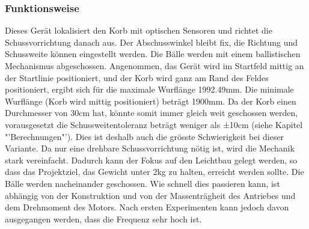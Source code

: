 \subsubsection{Funktionsweise}
Dieses Gerät lokalisiert den Korb mit optischen Sensoren und richtet die 
Schussvorrichtung danach aus. Der Abschusswinkel bleibt fix, die Richtung und 
Schussweite können eingestellt werden. Die Bälle werden mit einem 
ballistischen Mechanismus abgeschossen. Angenommen, das Gerät wird im Startfeld 
mittig an der Startlinie positioniert, und der Korb wird ganz am Rand des 
Feldes positioniert, ergibt sich für die maximale Wurflänge 1992.49mm. Die 
minimale Wurflänge (Korb wird mittig positioniert) beträgt 1900mm. Da der Korb 
einen Durchmesser von 30cm hat, könnte somit immer gleich weit geschossen 
werden, vorausgesetzt die Schussweitentoleranz beträgt weniger als ±10cm 
(siehe Kapitel "'Berechnungen"'). Dies ist deshalb auch die grösste 
Schwierigkeit bei dieser Variante. Da nur eine drehbare Schussvorrichtung nötig 
ist, wird die Mechanik stark vereinfacht. Dadurch kann der Fokus auf den 
Leichtbau gelegt werden, so dass das Projektziel, das Gewicht unter 2kg zu 
halten, erreicht werden sollte. Die Bälle werden nacheinander geschossen. Wie 
schnell dies passieren kann, ist abhängig von der Konstruktion und von der 
Massenträgheit des Antriebes und dem Drehmoment des Motors. Nach ersten 
Experimenten kann jedoch davon ausgegangen werden, dass die Frequenz sehr hoch 
ist.



\clearpage

